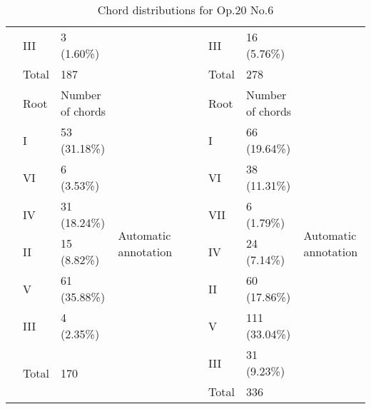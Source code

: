 \begin{table}[tbp]
{\begin{tabular}{|l|l|l|l|l|l|l|l|l|}
 & III & 3 (1.60\%) &  &  &  & III & 16 (5.76\%) &  \\ \cline{2-3} \cline{7-8}
 & Total & 187 &  &  &  & Total & 278 &  \\ \cline{2-4} \cline{7-9}
 & Root & Number of chords & \multirow{9}{*}{Automatic annotation} &  &  & Root & Number of chords & \multirow{9}{*}{Automatic annotation} \\ \cline{2-3} \cline{7-8}
 & I & 53 (31.18\%) &  &  &  & I & 66 (19.64\%) &  \\ \cline{2-3} \cline{7-8}
 & VI & 6 (3.53\%) &  &  &  & VI & 38 (11.31\%) &  \\ \cline{2-3} \cline{7-8}
 & IV & 31 (18.24\%) &  &  &  & VII & 6 (1.79\%) &  \\ \cline{2-3} \cline{7-8}
 & II & 15 (8.82\%) &  &  &  & IV & 24 (7.14\%) &  \\ \cline{2-3} \cline{7-8}
 & V & 61 (35.88\%) &  &  &  & II & 60 (17.86\%) &  \\ \cline{2-3} \cline{7-8}
 & III & 4 (2.35\%) &  &  &  & V & 111 (33.04\%) &  \\ \cline{2-3} \cline{7-8}
 & \multirow{2}{*}{Total} & \multirow{2}{*}{170} &  &  &  & III & 31 (9.23\%) &  \\ \cline{7-8}
 &  &  &  &  &  & Total & 336 &  \\ \cline{1-4} \cline{6-9}
\end{tabular}
}
\caption{Chord distributions for Op.20 No.6}
\label{table:chords_op20n6}
\end{table}

\newpage
